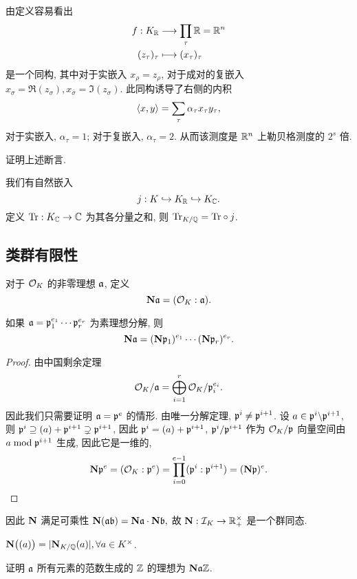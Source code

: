 由定义容易看出
\begin{equation}\label{eq:minkow_iso}
  \fct{f: K_\BR}{\prod_\tau \BR=\BR^n}{(z_\tau)_\tau}{(x_\tau)_\tau}
\end{equation}
是一个同构, 其中对于实嵌入 $x_\rho=z_\rho$, 对于成对的复嵌入 $x_\sigma=\Re(z_\sigma),x_{\bar \sigma}=\Im(z_\sigma)$.
此同构诱导了右侧的内积
\begin{equation}
  \pair{x,y}=\sum_{\tau} \alpha_\tau x_\tau y_\tau,
\end{equation}
对于实嵌入, $\alpha_\tau=1$; 对于复嵌入, $\alpha_\tau=2$.
从而该测度是 $\BR^n$ 上勒贝格测度的 $2^s$ 倍.

\begin{exercise}
证明上述断言.
\end{exercise}


我们有自然嵌入
  \[j:K\inj K_\BR\inj K_\BC.\]
定义 $\Tr:K_\BC\to \BC$ 为其各分量之和, 则 $\Tr_{K/\BQ}=\Tr\circ j$.


\subsection{类群有限性}

对于 $\CO_K$ 的非零理想 $\fa$, 定义
  \[\bfN\fa=(\CO_K:\fa).\]

\begin{theorem}{}{}
如果 $\fa=\fp_1^{e_1}\cdots\fp_r^{e_r}$ 为素理想分解, 则
  \[\bfN\fa=(\bfN\fp_1)^{e_1}\cdots(\bfN\fp_r)^{e_r}.\]
\end{theorem}
\begin{proof}
由中国剩余定理
  \[\CO_K/\fa=\bigoplus_{i=1}^r\CO_K/\fp_i^{e_i}.\]
因此我们只需要证明 $\fa=\fp^e$ 的情形. 由唯一分解定理, $\fp^i\neq \fp^{i+1}$. 设 $a\in\fp^i\bs \fp^{i+1}$, 则 $\fp^i\supseteq (a)+\fp^{i+1}\supsetneq \fp^{i+1}$, 因此 $\fp^i=(a)+\fp^{i+1}$, $\fp^i/\fp^{i+1}$ 作为 $\CO_K/\fp$ 向量空间由 $a\mod \fp^{i+1}$ 生成, 因此它是一维的,
  \[\bfN\fp^e=(\CO_K:\fp^e)=\prod_{i=0}^{e-1} (\fp^i:\fp^{i+1})=(\bfN\fp)^e.\]
\end{proof}

因此 $\bfN$ 满足可乘性 $\bfN(\fa\fb)=\bfN\fa \cdot\bfN\fb,$ 故 $\bfN:\CI_K\to \BR_+^\times$ 是一个群同态.

\begin{exercise}
$\bfN\bigl((a)\bigr)=|\bfN_{K/\BQ}(a)|,\forall a\in K^\times$.
\end{exercise}

\begin{exercise}
证明 $\fa$ 所有元素的范数生成的 $\BZ$ 的理想为 $\bfN\fa \BZ$.
\end{exercise}

